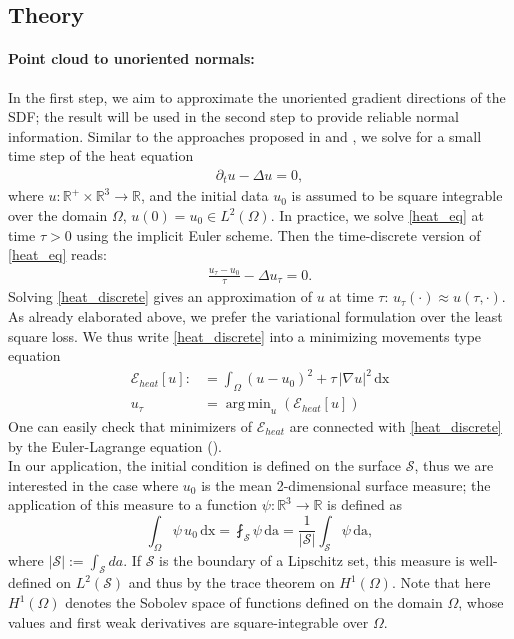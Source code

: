 \documentclass[12pt,openany]{book}
\newcommand{\R}{\mathbb{R}}
\def\S{\mathcal{S}}
\theoremstyle{plainnormal}
\theoremstyle{remark}
\DeclareMathOperator*{\argmin}{arg\,min}
\begin{document}
\subsection{Theory}
\paragraph{Point cloud to unoriented normals:}
In the first step, we aim to approximate the unoriented gradient directions of the SDF; the result will be used in the second step to provide reliable normal information. Similar to the approaches proposed in \cite{Crane_2013} and \cite{FengCrane}, we solve for a small time step of the heat equation 
\begin{align}
\partial_t u - \Delta u = 0 \label{heat_eq},
\end{align} where $u: \R^+ \times \R^3 \rightarrow \R$, and the initial data $u_0$ is assumed to be square integrable over the domain $\Omega$, $u(0) = u_0 \in L^2(\Omega)$. In practice, we solve \cref{heat_eq} at time $\tau > 0$ using the implicit Euler scheme. Then the time-discrete version of \cref{heat_eq} reads: 
\begin{align}\label{heat_discrete}
    \frac{u_\tau - u_0}{\tau} - \Delta u_\tau = 0.
\end{align}
Solving \cref{heat_discrete} gives an approximation of $u$ at time $\tau$: $u_\tau(\cdot) \approx u(\tau,\cdot)$.\\
As already elaborated above, we prefer the variational formulation over the least square loss. We thus write \cref{heat_discrete} into a minimizing movements type equation
\begin{align}\label{loss_heat}
    \mathcal{E}_{heat}[u] :&= \int_\Omega (u - u_0)^2 + \tau\, |\nabla u|^2 \,\mathrm{dx} \\
    u_\tau &= \argmin_u (\mathcal{E}_{heat}[u])
\end{align}
One can easily check that minimizers of $\mathcal{E}_{heat}$ are connected with \cref{heat_discrete} by the Euler-Lagrange equation (). \\
In our application, the initial condition is defined on the surface $\S$, thus we are interested in the case where $u_0$ is the mean 2-dimensional surface measure; the application of this measure to a function $\psi: \R^3 \rightarrow\R$ is defined as$$\int_\Omega \psi \,u_0 \,\mathrm{dx} =\fint_\S \psi\,\mathrm{da} = \frac{1}{|\mathcal{S}|} \int_\mathcal{S} \psi \,\mathrm{da},$$
where $|\mathcal{S}| := \int_\S da$.
If $\S$ is the boundary of a Lipschitz set, this measure is well-defined on $L^2(\S)$ and thus by the trace theorem on $H^1(\Omega)$. Note that here $H^1(\Omega)$ denotes the Sobolev space of functions defined on the domain $\Omega$, whose values and first weak derivatives are square-integrable over $\Omega$.
\end{document}
